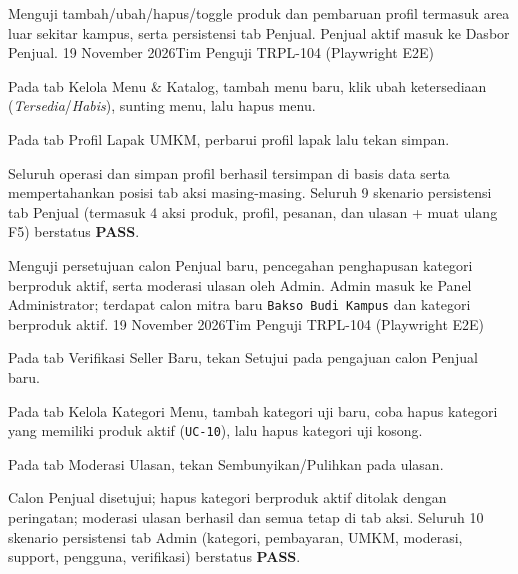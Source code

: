 {Menguji tambah/ubah/hapus/toggle produk dan pembaruan profil termasuk area luar sekitar kampus, serta persistensi tab Penjual.}
{Penjual aktif masuk ke Dasbor Penjual.}
{19 November 2026}{Tim Penguji TRPL-104 (Playwright E2E)}
{\begin{uclist}
  \item Pada tab Kelola Menu \& Katalog, tambah menu baru, klik ubah ketersediaan (\textit{Tersedia}/\textit{Habis}), sunting menu, lalu hapus menu.
  \item Pada tab Profil Lapak UMKM, perbarui profil lapak lalu tekan simpan.
\end{uclist}}
{Seluruh operasi dan simpan profil berhasil tersimpan di basis data serta mempertahankan posisi tab aksi masing-masing.}
{Seluruh 9 skenario persistensi tab Penjual (termasuk 4 aksi produk, profil, pesanan, dan ulasan + muat ulang F5) berstatus \textbf{PASS}.}

{Menguji persetujuan calon Penjual baru, pencegahan penghapusan kategori berproduk aktif, serta moderasi ulasan oleh Admin.}
{Admin masuk ke Panel Administrator; terdapat calon mitra baru \texttt{Bakso Budi Kampus} dan kategori berproduk aktif.}
{19 November 2026}{Tim Penguji TRPL-104 (Playwright E2E)}
{\begin{uclist}
  \item Pada tab Verifikasi Seller Baru, tekan Setujui pada pengajuan calon Penjual baru.
  \item Pada tab Kelola Kategori Menu, tambah kategori uji baru, coba hapus kategori yang memiliki produk aktif (\texttt{UC-10}), lalu hapus kategori uji kosong.
  \item Pada tab Moderasi Ulasan, tekan Sembunyikan/Pulihkan pada ulasan.
\end{uclist}}
{Calon Penjual disetujui; hapus kategori berproduk aktif ditolak dengan peringatan; moderasi ulasan berhasil dan semua tetap di tab aksi.}
{Seluruh 10 skenario persistensi tab Admin (kategori, pembayaran, UMKM, moderasi, support, pengguna, verifikasi) berstatus \textbf{PASS}.}


